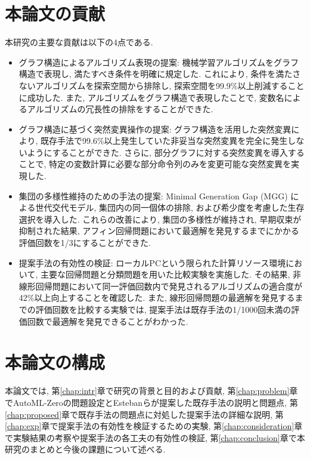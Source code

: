 \documentclass[11pt,oneside,openany,report]{jsbook}
\begin{document}
\section{本論文の貢献}\label{sec:intr:contribution}

本研究の主要な貢献は以下の4点である.

\begin{itemize}
  \item グラフ構造によるアルゴリズム表現の提案: 機械学習アルゴリズムをグラフ構造で表現し, 満たすべき条件を明確に規定した. これにより, 条件を満たさないアルゴリズムを探索空間から排除し, 探索空間を99.9\%以上削減することに成功した. また, アルゴリズムをグラフ構造で表現したことで, 変数名によるアルゴリズムの冗長性の排除をすることができた.
  \item グラフ構造に基づく突然変異操作の提案: グラフ構造を活用した突然変異により, 既存手法で99.6\%以上発生していた非妥当な突然変異を完全に発生しないようにすることができた. さらに, 部分グラフに対する突然変異を導入することで, 特定の変数計算に必要な部分命令列のみを変更可能な突然変異を実現した.
  \item 集団の多様性維持のための手法の提案: Minimal Generation Gap (MGG) による世代交代モデル, 集団内の同一個体の排除, および希少度を考慮した生存選択を導入した. これらの改善により, 集団の多様性が維持され, 早期収束が抑制された結果, アフィン回帰問題において最適解を発見するまでにかかる評価回数を1/3にすることができた.
  \item 提案手法の有効性の検証: ローカルPCという限られた計算リソース環境において, 主要な回帰問題と分類問題を用いた比較実験を実施した. その結果, 非線形回帰問題において同一評価回数内で発見されるアルゴリズムの適合度が42\%以上向上することを確認した. また, 線形回帰問題の最適解を発見するまでの評価回数を比較する実験では, 提案手法は既存手法の1/1000回未満の評価回数で最適解を発見できることがわかった.
\end{itemize}

\section{本論文の構成}\label{sec:intr:structure}
本論文では, 第\ref{chap:intr}章で研究の背景と目的および貢献, 第\ref{chap:problem}章でAutoML-Zeroの問題設定とEstebanらが提案した既存手法の説明と問題点, 第\ref{chap:proposed}章で既存手法の問題点に対処した提案手法の詳細な説明, 第\ref{chap:exp}章で提案手法の有効性を検証するための実験, 第\ref{chap:consideration}章で実験結果の考察や提案手法の各工夫の有効性の検証,  第\ref{chap:conclusion}章で本研究のまとめと今後の課題について述べる.
\end{document}
